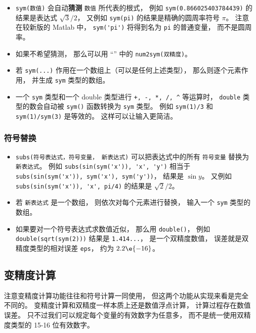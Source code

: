 \begin{itemize}
\item  \verb`sym(数值)` 会自动\textbf{猜测} \verb`数值` 所代表的根式， 例如 \verb`sym(0.866025403784439)` 的结果是表达式 $\sqrt{3}/2$， 又例如 \verb`sym(pi)` 的结果是精确的圆周率符号 $\pi$。 注意在较新版的 Matlab 中， \verb`sym('pi')` 将得到名为 \verb`pi` 的普通变量， 而不是圆周率。

\item 如果不希望猜测， 那么可以用 “” 中的 \verb`num2sym(双精度)`。

\item 若 \verb`sym(...)` 作用在一个数组上（可以是任何上述类型）， 那么则逐个元素作用， 并生成 \verb`sym` 类型的数组。

\item 一个 \verb`sym` 类型和一个 double 类型进行 \verb`+, -, *, /, ^` 等运算时， \verb`double` 类型的数会自动被 \verb`sym()` 函数转换为 \verb`sym` 类型。 例如 \verb`sym(1)/3` 和 \verb`sym(1)/sym(3)` 是等效的。 这样可以让输入更简洁。
\end{itemize}

\subsubsection{符号替换}
\begin{itemize}
\item \verb`subs(符号表达式，符号变量， 新表达式)` 可以把表达式中的所有 \verb`符号变量` 替换为 \verb`新表达式`。 例如 \verb`subs(sin(sym('x')), 'x', 'y')` 相当于 \verb`subs(sin(sym('x')), sym('x'), sym('y'))`， 结果是 $\sin y$。 又例如 \verb`subs(sin(sym('x')), 'x', pi/4)` 的结果是 $\sqrt 2/2$。
\item 若 \verb`新表达式` 是一个数组， 则依次对每个元素进行替换， 输入一个 \verb`sym` 类型的数组。
\item 如果要对一个符号表达式求数值近似， 那么用 \verb`double()`， 例如 \verb`double(sqrt(sym(2)))` 结果是 \verb`1.414...`， 是一个双精度数值， 误差就是双精度类型的相对误差 \verb`eps`， 约为 $2.2\e{-16}$。
\end{itemize}

\subsection{变精度计算}
注意变精度计算功能往往和符号计算一同使用， 但这两个功能从实现来看是完全不同的。 变精度计算和双精度一样本质上还是数值浮点计算， 计算过程存在数值误差。 只不过我们可以规定每个变量的有效数字为任意多， 而不是统一使用双精度类型的 15-16 位有效数字。

